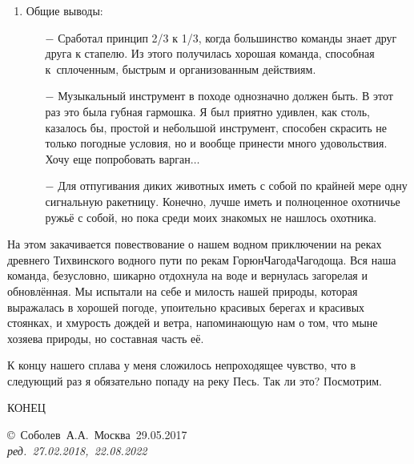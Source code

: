 \begin{enumerate}
\begin{enumerate}
	\end{enumerate}
\item Общие выводы:
	\begin{enumerate}
		\item[$-$] Сработал принцип 2/3 к 1/3, когда большинство команды знает друг друга к стапелю. Из этого получилась хорошая команда, способная к~сплоченным, быстрым и организованным действиям.
		\item[$-$] Музыкальный инструмент в походе однозначно должен быть. В этот раз это была губная гармошка. Я был приятно удивлен, как столь, казалось бы, простой и небольшой инструмент, способен скрасить не только погодные условия, но и вообще принести много удовольствия. Хочу еще попробовать варган$\ldots$
		\item[$-$] Для отпугивания диких животных иметь с собой по крайней мере одну сигнальную ракетницу. Конечно, лучше иметь и полноценное охотничье ружьё с собой, но пока среди моих знакомых не нашлось охотника.
	\end{enumerate}
\end{enumerate}	

На этом закачивается повествование о нашем водном приключении на реках древнего Тихвинского водного пути по рекам Горюн\sdash Чагода\sdash Чагодоща. Вся наша команда, безусловно, шикарно отдохнула на воде и вернулась загорелая и обновлённая. Мы испытали на себе и милость нашей природы, которая выражалась в хорошей погоде, упоительно красивых берегах и красивых стоянках, и хмурость дождей и ветра, напоминающую нам о том, что мы\mdash не хозяева природы, но составная часть её.

К концу нашего сплава у меня сложилось непроходящее чувство, что в следующий раз я обязательно попаду на реку Песь. Так ли это? Посмотрим.

\begin{center}
\end{center}

\begin{center}
	\Large {КОНЕЦ}
\end{center}
\vspace{\fill}
\begin{flushright}
	\copyright~Соболев~А.А.~Москва~29.05.2017\\
	\textit{ред.~27.02.2018,~22.08.2022}
\end{flushright}